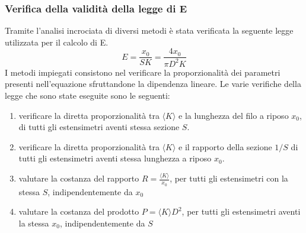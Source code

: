 \documentclass[a4paper,11pt,oneside]{article}
\begin{document}
\begin{figure}[H]
    \centering
    \newline
    \newline
    \newline
    
\end{figure}
\begin{figure}[h!]
    \centering
\end{figure}

\newpage
\subsubsection*{Verifica della validità della legge di E}
Tramite l'analisi incrociata di diversi metodi è stata verificata la seguente legge utilizzata per il calcolo di E.
\begin{equation*}
    E=\frac{x_0}{S K}=\frac{4 x_0}{\pi D^{2}K}
    \label{equation:legge_e}
\end{equation*}
I metodi impiegati consistono nel verificare la proporzionalità dei parametri presenti nell'equazione sfruttandone la dipendenza lineare. Le varie verifiche della legge che sono state eseguite sono le seguenti:
\begin{enumerate}
    \item verificare la diretta proporzionalità tra $\langle K \rangle$ e la lunghezza del filo a riposo $x_0$, di tutti gli estensimetri aventi stessa sezione $S$.
    \item verificare la diretta proporzionalità tra $\langle K \rangle$ e il rapporto della sezione $1/S$ di tutti gli estensimetri aventi stessa lunghezza a riposo $x_{0}$.
    \item valutare la costanza del rapporto $R=\frac{\langle K \rangle}{x_{0}}$, per tutti gli estensimetri con la stessa $S$, indipendentemente da $x_{0}$
    \item valutare la costanza del prodotto $P={ \langle K \rangle} D^2 $, per tutti gli estensimetri aventi la stessa $x_{0}$, indipendentemente da $S$
\end{enumerate}
\end{document}
